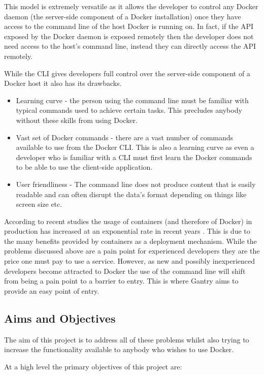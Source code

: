 This model is extremely versatile as it allows the developer to control any \gls{Docker daemon} (the server-side component of a Docker installation) once they have access to the command line of the host Docker is running on. In fact, if the API exposed by the Docker daemon is exposed remotely then the developer does not need access to the host's command line, instead they can directly access the API remotely.

While the \gls{CLI} gives developers full control over the server-side component of a \gls{Docker host} it also has its drawbacks.

\begin{itemize}
	\item Learning curve - the person using the command line must be familiar with typical commands used to achieve certain tasks. This precludes anybody without these skills from using Docker.
	\item Vast set of Docker commands - there are a vast number of commands available to use from the Docker CLI. This is also a learning curve as even a developer who is familiar with a CLI must first learn the Docker commands to be able to use the client-side application. 
	\item User friendliness - The command line does not produce content that is easily readable and can often disrupt the data's format depending on things like screen size etc.
\end{itemize}

According to recent studies the usage of containers (and therefore of Docker) in production has increased at an exponential rate in recent years \citep{DockerUsage2016}. This is due to the many benefits provided by containers as a deployment mechanism. While the problems discussed above are a pain point for experienced developers they are the price one must pay to use a service. However, as new and possibly inexperienced developers become attracted to Docker the use of the command line will shift from being a pain point to a barrier to entry. This is where Gantry aims to provide an easy point of entry.

\subsection{Aims and Objectives}
\label{sub:aims}
The aim of this project is to address all of these problems whilst also trying to increase the functionality available to anybody who wishes to use Docker.

At a high level the primary objectives of this project are:


